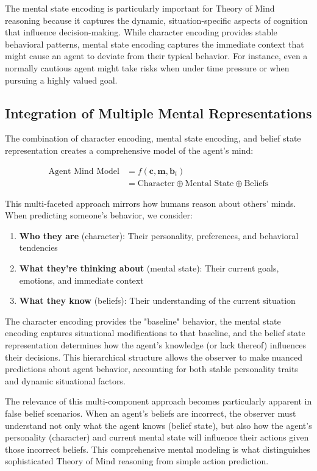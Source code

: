 \documentclass[11pt]{article}
\begin{document}
The mental state encoding is particularly important for Theory of Mind reasoning because it captures the dynamic, situation-specific aspects of cognition that influence decision-making. While character encoding provides stable behavioral patterns, mental state encoding captures the immediate context that might cause an agent to deviate from their typical behavior. For instance, even a normally cautious agent might take risks when under time pressure or when pursuing a highly valued goal.

\subsection{Integration of Multiple Mental Representations}

The combination of character encoding, mental state encoding, and belief state representation creates a comprehensive model of the agent's mind:

\begin{align}
    \text{Agent Mind Model} &= f(\mathbf{c}, \mathbf{m}, \mathbf{b}_t) \\
    &= \text{Character} \oplus \text{Mental State} \oplus \text{Beliefs}
\end{align}

This multi-faceted approach mirrors how humans reason about others' minds. When predicting someone's behavior, we consider:
\begin{enumerate}
    \item \textbf{Who they are} (character): Their personality, preferences, and behavioral tendencies
    \item \textbf{What they're thinking about} (mental state): Their current goals, emotions, and immediate context
    \item \textbf{What they know} (beliefs): Their understanding of the current situation
\end{enumerate}

The character encoding provides the "baseline" behavior, the mental state encoding captures situational modifications to that baseline, and the belief state representation determines how the agent's knowledge (or lack thereof) influences their decisions. This hierarchical structure allows the observer to make nuanced predictions about agent behavior, accounting for both stable personality traits and dynamic situational factors.

The relevance of this multi-component approach becomes particularly apparent in false belief scenarios. When an agent's beliefs are incorrect, the observer must understand not only what the agent knows (belief state), but also how the agent's personality (character) and current mental state will influence their actions given those incorrect beliefs. This comprehensive mental modeling is what distinguishes sophisticated Theory of Mind reasoning from simple action prediction.
\end{document}
